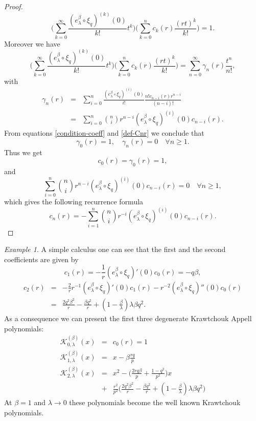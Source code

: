\documentclass{birkjour}
\theoremstyle{definition}
\theoremstyle{remark}
\newtheorem*{ex}{Example}
\numberwithin{equation}{section}
\begin{document}
\begin{proof}
$$\displaystyle{\Big(\sum^{\infty}_{k=0}\frac{(e^{\beta}_{\lambda}\circ \xi_{q})^{(k)}(0)}{k!}t^{k}\Big)
\Big(\sum^{n}_{k=0}c_{k}(r)\frac{(rt)^{k}}{k!}\Big)=1}.$$ Moreover
we have
$$\displaystyle{\Big(\sum^{\infty}_{k=0}\frac{(e^{\beta}_{\lambda}\circ \xi_{q})^{(k)}(0)}{k!}t^{k}\Big)
\Big(\sum^{n}_{k=0}c_{k}(r)\frac{(rt)^{k}}{k!}\Big)=\sum^{\infty}_{n=0}\gamma_{n}(r)\frac{t^{n}}{n!}},$$
with
\begin{eqnarray}\label{def-Cnr}
\gamma_{n}(r)&=&\displaystyle{\sum^{n}_{i=0}\frac{(e^{\beta}_{\lambda}\circ \xi_{q})^{(i)}(0)}{i!}\frac{n!c_{n-i}(r)r^{n-i}}{(n-i)!}}\nonumber\\
&=&\displaystyle{\sum^{n}_{i=0}
\binom{n}{i}r^{n-i}(e^{\beta}_{\lambda}\circ
\xi_{q})^{(i)}(0)c_{n-i}(r)}.
\end{eqnarray}
From equations \eqref{condition-coeff} and \eqref{def-Cnr} we
conclude that
$$\gamma_{0}(r)=1,\quad \gamma_{n}(r)=0\quad \forall n\geq1.$$
Thus we get
$$c_{0}(r)=\gamma_{0}(r)=1,$$
and
$$\displaystyle{\sum^{n}_{i=0}
\binom{n}{i}r^{n-i}(e^{\beta}_{\lambda}\circ
\xi_{q})^{(i)}(0)c_{n-i}(r)=0\quad\forall n\geq1},$$ which gives the
following recurrence formula
$$c_{n}(r)=-\displaystyle{\sum^{n}_{i=1}
\binom{n}{i}r^{-i}(e^{\beta}_{\lambda}\circ
\xi_{q})^{(i)}(0)c_{n-i}(r)}.$$
\end{proof}
\begin{ex}
A simple calculus one can see that the first and the second
coefficients are given by
$$
c_{1}(r)=\displaystyle{-\frac{1}{r}(e^{\beta}_{\lambda}\circ
\xi_{q})'(0)c_{0}(r)=-q\beta},
$$
$$\begin{array}{lll}
c_{2}(r)&=&\displaystyle{-\frac{2}{r}r^{-1}(e^{\beta}_{\lambda}\circ \xi_{q})'(0)c_{1}(r)-r^{-2}(e^{\beta}_{\lambda}\circ \xi_{q})''(0)c_{0}(r)}\\
&=&\displaystyle{\frac{2q^{2}\beta^{2}}{r}-\frac{\beta
q^{2}}{r}+(1-\frac{\beta}{\lambda})\lambda\beta q^{2}}.
\end{array}$$
As a consequence we can present the first three degenerate
Krawtchouk Appell polynomials:
$$\begin{array}{lll}
\mathcal{K}^{(\beta)}_{0, \lambda}(x)&=&c_{0}(r)=1\\
\mathcal{K}^{(\beta)}_{1, \lambda}(x)&=&\displaystyle{x-\beta\frac{rq}{p}}\\
\mathcal{K}^{(\beta)}_{2, \lambda}(x)&=&\displaystyle{x^{2}-\Big(\frac{2rq\beta}{p}+\frac{1-q^{2}}{p^{2}}\Big)x}\\
&+&\displaystyle{\frac{r^{2}}{p^{2}}\Big(\frac{2q^{2}\beta^{2}}{r}-\frac{\beta
q^{2}}{r}+(1-\frac{\beta}{\lambda})\lambda\beta q^{2}\Big)}
\end{array}$$
At $\beta= 1$ and $\lambda\rightarrow 0$ these polynomials become
the well known Krawtchouk polynomials.
\end{ex}
\end{document}
